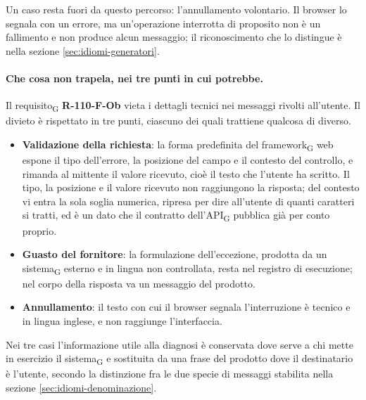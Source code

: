 \documentclass[a4paper, 10pt]{article}
\begin{document}
\noindent Un caso resta fuori da questo percorso: l'annullamento volontario. Il browser lo segnala con un errore, ma un'operazione interrotta di proposito non è un fallimento e non produce alcun messaggio; il riconoscimento che lo distingue è nella sezione \ref{sec:idiomi-generatori}.

\paragraph{Che cosa non trapela, nei tre punti in cui potrebbe.}
Il requisito\textsubscript{G} \textbf{R-110-F-Ob} vieta i dettagli tecnici nei messaggi rivolti all'utente. Il divieto è rispettato in tre punti, ciascuno dei quali trattiene qualcosa di diverso.

\begin{itemize}
    \setlength{\itemsep}{3pt}
    \item \textbf{Validazione della richiesta}: la forma predefinita del framework\textsubscript{G} web espone il tipo dell'errore, la posizione del campo e il contesto del controllo, e rimanda al mittente il valore ricevuto, cioè il testo che l'utente ha scritto. Il tipo, la posizione e il valore ricevuto non raggiungono la risposta; del contesto vi entra la sola soglia numerica, ripresa per dire all'utente di quanti caratteri si tratti, ed è un dato che il contratto dell'API\textsubscript{G} pubblica già per conto proprio.
    \item \textbf{Guasto del fornitore}: la formulazione dell'eccezione, prodotta da un sistema\textsubscript{G} esterno e in lingua non controllata, resta nel registro di esecuzione; nel corpo della risposta va un messaggio del prodotto.
    \item \textbf{Annullamento}: il testo con cui il browser segnala l'interruzione è tecnico e in lingua inglese, e non raggiunge l'interfaccia.
\end{itemize}

\noindent Nei tre casi l'informazione utile alla diagnosi è conservata dove serve a chi mette in esercizio il sistema\textsubscript{G} e sostituita da una frase del prodotto dove il destinatario è l'utente, secondo la distinzione fra le due specie di messaggi stabilita nella sezione \ref{sec:idiomi-denominazione}.


\end{document}

